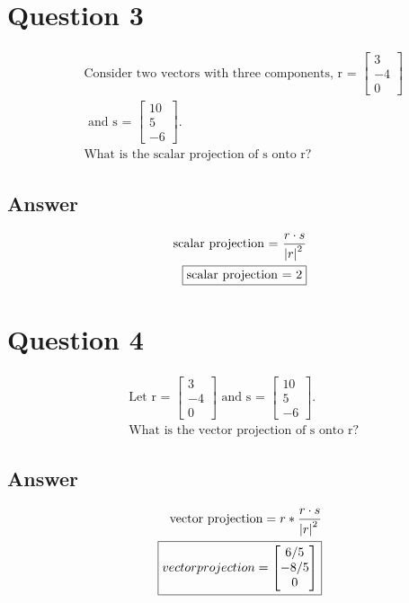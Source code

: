 \documentclass[12pt]{article}
\begin{document}
\section*{Question 3}
    \begin{eqnarray*}
        & &\text{Consider two vectors with three components, r = }
        \begin{bmatrix}
            3 \\ -4 \\ 0
        \end{bmatrix} \\
        & &\text{ and s = }
        \begin{bmatrix}
            10 \\ 5 \\ -6
        \end{bmatrix}
        \text{.} \\
        & &\text{What is the scalar projection of s onto r?}
    \end{eqnarray*}

\subsection*{Answer}
    \begin{eqnarray*}
        & &\text{scalar projection = } \frac{r \cdot s}{\abs{r}^2} \\
        & &\fbox{scalar projection = 2}
    \end{eqnarray*}

\section*{Question 4}
    \begin{eqnarray*}
        & &\text{Let r = }
        \begin{bmatrix}
            3 \\ -4 \\ 0
        \end{bmatrix}
        \text{ and s = }
        \begin{bmatrix}
            10 \\ 5 \\ -6
        \end{bmatrix}
        \text{.} \\
        & &\text{What is the vector projection of s onto r?}
    \end{eqnarray*}

\subsection*{Answer}
    \begin{eqnarray*}
        & &\text{vector projection} = r * \frac{r \cdot s}{\abs{r}^2} \\
        & &\boxed{vector projection = 
        \begin{bmatrix}
            6/5 \\ -8/5 \\ 0
        \end{bmatrix}}
    \end{eqnarray*}
	
	

\end{document}
